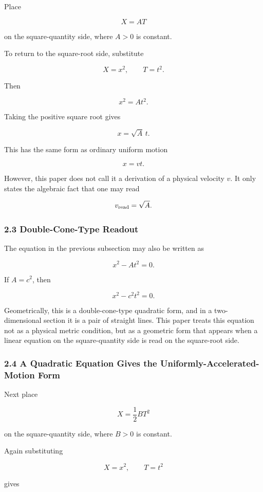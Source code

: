 \documentclass[
]{ltjsarticle}
\begin{document}
Place

\[
X=A T
\]

on the square-quantity side, where \(A>0\) is constant.

To return to the square-root side, substitute

\[
X=x^2,\qquad T=t^2.
\]

Then

\[
x^2=A t^2.
\]

Taking the positive square root gives

\[
x=\sqrt{A}\,t.
\]

This has the same form as ordinary uniform motion

\[
x=vt.
\]

However, this paper does not call it a derivation of a physical velocity
\(v\). It only states the algebraic fact that one may read

\[
v_{\rm read}=\sqrt{A}.
\]

\subsubsection{2.3 Double-Cone-Type
Readout}\label{double-cone-type-readout}

The equation in the previous subsection may also be written as

\[
x^2-A t^2=0.
\]

If \(A=c^2\), then

\[
x^2-c^2t^2=0.
\]

Geometrically, this is a double-cone-type quadratic form, and in a
two-dimensional section it is a pair of straight lines. This paper
treats this equation not as a physical metric condition, but as a
geometric form that appears when a linear equation on the
square-quantity side is read on the square-root side.

\subsubsection{2.4 A Quadratic Equation Gives the
Uniformly-Accelerated-Motion
Form}\label{a-quadratic-equation-gives-the-uniformly-accelerated-motion-form}

Next place

\[
X=\frac{1}{2} B T^2
\]

on the square-quantity side, where \(B>0\) is constant.

Again substituting

\[
X=x^2,\qquad T=t^2
\]

gives
\end{document}
